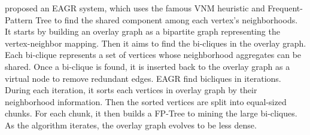 {%

%
%
%


\cite{mondal2014eagr} proposed an EAGR system, which uses the famous VNM heuristic and Frequent-Pattern
Tree to find the shared component among each vertex's neighborhoods. It starts by building an
overlay graph as a bipartite graph representing the vertex-neighbor mapping. Then it aims to
find the bi-cliques in the overlay graph. Each bi-clique represents a set of vertices whose neighborhood
aggregates can be shared. Once a bi-clique is found, it is inserted back to the overlay graph as
a virtual node to remove redundant edges. EAGR find bicliques in iterations. During each iteration,
it sorts each vertices in overlay graph by their neighborhood information. Then the sorted vertices 
are split into equal-sized chunks. For each chunk, it then builds a FP-Tree to mining the large bi-cliques. 
As the algorithm iterates, the overlay graph evolves to be less dense. 


}
